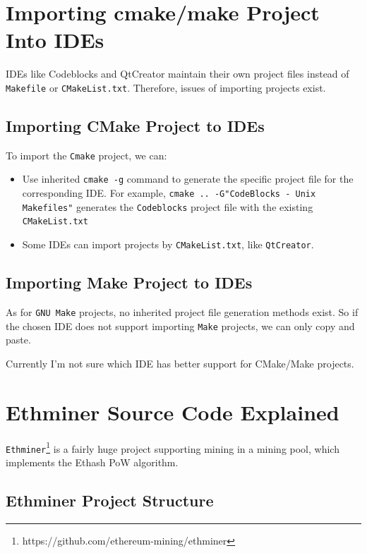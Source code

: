 \documentclass[11pt]{article}
\begin{document}
\section{Importing cmake/make Project Into IDEs}

IDEs like Codeblocks and QtCreator maintain their own project files instead of  \texttt{Makefile} or \texttt{CMakeList.txt}. Therefore, issues of importing projects exist.

\subsection{Importing CMake Project to IDEs}

To import the \texttt{Cmake} project, we can:

\begin{itemize}
\item Use inherited \texttt{cmake -g} command to generate the specific project file for the corresponding IDE. For example, \texttt{cmake .. -G"CodeBlocks - Unix Makefiles"} generates the \texttt{Codeblocks} project file with the existing \texttt{CMakeList.txt}
\item Some IDEs can import projects by \texttt{CMakeList.txt}, like \texttt{QtCreator}.
\end{itemize}

\subsection{Importing Make Project to IDEs}

As for \texttt{GNU Make} projects, no inherited project file generation methods exist. So if the chosen IDE does not support importing \texttt{Make} projects, we can only copy and paste.

Currently I'm not sure which IDE has better support for CMake/Make projects.

\section{Ethminer Source Code Explained}

\texttt{Ethminer}\footnote{https://github.com/ethereum-mining/ethminer} is a fairly huge project supporting mining in a mining pool, which implements the Ethash PoW algorithm.

\subsection{Ethminer Project Structure}
\end{document}
